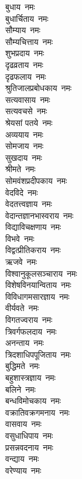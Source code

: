 \begin{flushleft}
\begin{multicols}{2}
बुधाय~नमः\\
बुधार्चिताय~नमः\\
सौम्याय~नमः\\
सौम्यचित्ताय~नमः\\
शुभप्रदाय~नमः\\
दृढव्रताय~नमः\\
दृढफलाय~नमः\\
श्रुतिजालप्रबोधकाय~नमः\\
सत्यवासाय~नमः\\
सत्यवचसे~नमः\hfill{}\\
श्रेयसां पतये~नमः\\
अव्ययाय~नमः\\
सोमजाय~नमः\\
सुखदाय~नमः\\
श्रीमते~नमः\\
सोमवंशप्रदीपकाय~नमः\\
वेदविदे~नमः\\
वेदतत्त्वज्ञाय~नमः\\
वेदान्तज्ञानभास्वराय~नमः\\
विद्याविचक्षणाय~नमः\hfill{}\\
विभवे~नमः\\
विद्वत्प्रीतिकराय~नमः\\
ऋजवे~नमः\\
विश्वानुकूलसञ्चाराय~नमः\\
विशेषविनयान्विताय~नमः\\
विविधागमसारज्ञाय~नमः\\
वीर्यवते~नमः\\
विगतज्वराय~नमः\\
त्रिवर्गफलदाय~नमः\\
अनन्ताय~नमः\hfill{}\\
त्रिदशाधिपपूजिताय~नमः\\
बुद्धिमते~नमः\\
बहुशास्त्रज्ञाय~नमः\\
बलिने~नमः\\
बन्धविमोचकाय~नमः\\
वक्रातिवक्रगमनाय~नमः\\
वासवाय~नमः\\
वसुधाधिपाय~नमः\\
प्रसन्नवदनाय~नमः\\
वन्द्याय~नमः\hfill{}\\
वरेण्याय~नमः\\

\end{multicols}
\end{flushleft}
